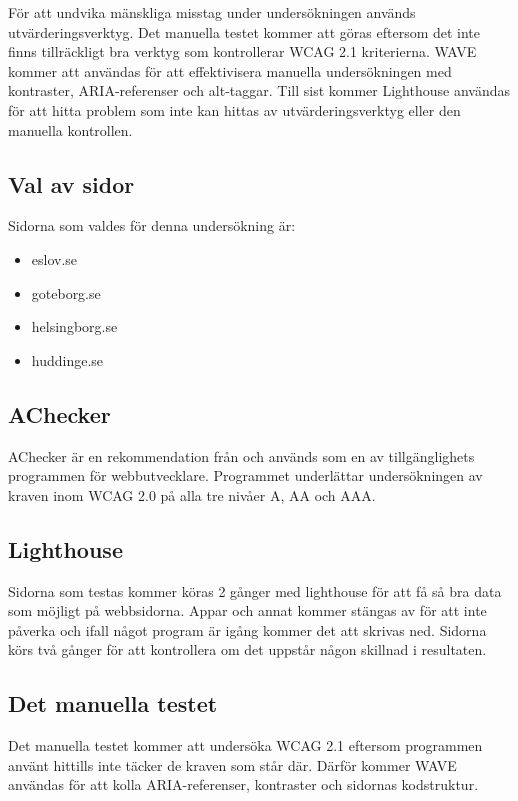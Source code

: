 \documentclass[11p]{article}
\begin{document}
    För att undvika mänskliga misstag under undersökningen används utvärderingsverktyg.
    Det manuella testet kommer att göras eftersom det inte finns tillräckligt bra verktyg som kontrollerar WCAG 2.1 kriterierna.
    WAVE kommer att användas för att effektivisera manuella undersökningen med kontraster, ARIA-referenser och alt-taggar.
    Till sist kommer Lighthouse användas för att hitta problem som inte kan hittas av utvärderingsverktyg eller den manuella kontrollen.

    \subsection{Val av sidor}
    Sidorna som valdes för denna undersökning är:

    \begin{itemize}
        \item eslov.se
        \item goteborg.se
        \item helsingborg.se
        \item huddinge.se
    \end{itemize}

    \subsection{AChecker}
    AChecker är en rekommendation från \textcite{AChecker} och används som en av tillgänglighets programmen för webbutvecklare.
    Programmet underlättar undersökningen av kraven inom WCAG 2.0 på alla tre nivåer A, AA och AAA.

    \subsection{Lighthouse}
    Sidorna som testas kommer köras 2 gånger med lighthouse för att få så bra data som möjligt på webbsidorna.
    Appar och annat kommer stängas av för att inte påverka och ifall något program är igång kommer det att skrivas ned.
    Sidorna körs två gånger för att kontrollera om det uppstår någon skillnad i resultaten.

    \subsection{Det manuella testet}
    Det manuella testet kommer att undersöka WCAG 2.1 eftersom programmen använt hittills inte täcker de kraven som står där.
    Därför kommer WAVE användas för att kolla ARIA-referenser, kontraster och sidornas kodstruktur.
\end{document}
